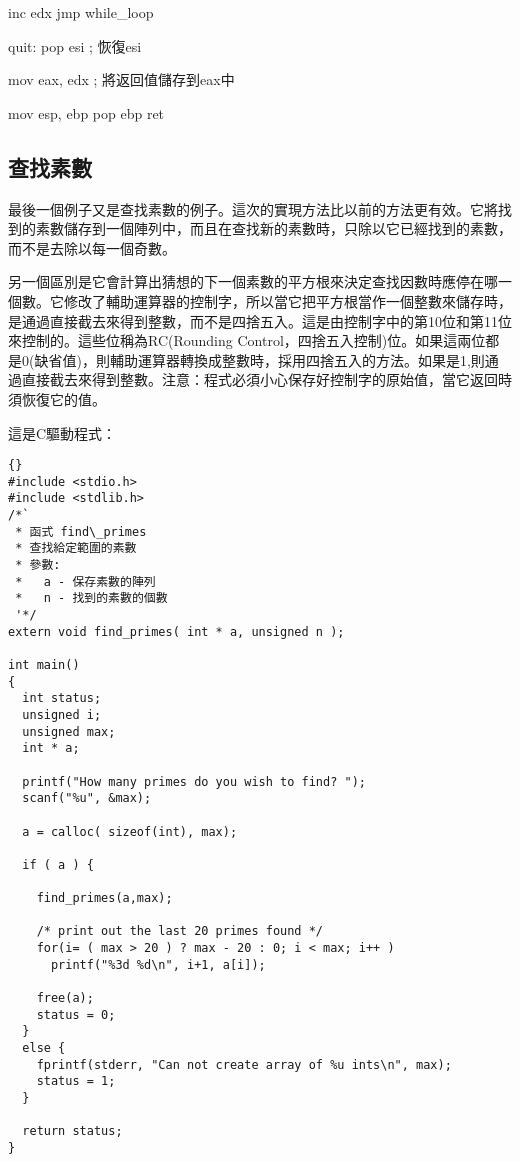{\begin{AsmCodeListing}[label=read.asm]
        inc     edx
        jmp     while_loop

quit:
        pop     esi                     ; 恢復esi

        mov     eax, edx                ; 將返回值儲存到eax中

        mov     esp, ebp
        pop     ebp
        ret
\end{AsmCodeListing}

\subsection{查找素數}

最後一個例子又是查找素數的例子。這次的實現方法比以前的方法更有效。它將找到的素數儲存到一個陣列中，而且在查找新的素數時，只除以它已經找到的素數，而不是去除以每一個奇數。

另一個區別是它會計算出猜想的下一個素數的平方根來決定查找因數時應停在哪一個數。它修改了輔助運算器的控制字，所以當它把平方根當作一個整數來儲存時，是通過直接截去來得到整數，而不是四捨五入。這是由控制字中的第10位和第11位來控制的。這些位稱為RC(Rounding Control，四捨五入控制)位。如果這兩位都是0(缺省值)，則輔助運算器轉換成整數時，採用四捨五入的方法。如果是1,則通過直接截去來得到整數。注意：程式必須小心保存好控制字的原始值，當它返回時須恢復它的值。

這是C驅動程式：
\lstset{escapeinside=`',language=Pascal,%
}
\begin{lstlisting}{}
#include <stdio.h>
#include <stdlib.h>
/*`
 * 函式 find\_primes
 * 查找給定範圍的素數
 * 參數:
 *   a - 保存素數的陣列
 *   n - 找到的素數的個數
 '*/
extern void find_primes( int * a, unsigned n );

int main()
{
  int status;
  unsigned i;
  unsigned max;
  int * a;

  printf("How many primes do you wish to find? ");
  scanf("%u", &max);

  a = calloc( sizeof(int), max);

  if ( a ) {

    find_primes(a,max);

    /* print out the last 20 primes found */
    for(i= ( max > 20 ) ? max - 20 : 0; i < max; i++ )
      printf("%3d %d\n", i+1, a[i]);

    free(a);
    status = 0;
  }
  else {
    fprintf(stderr, "Can not create array of %u ints\n", max);
    status = 1;
  }

  return status;
}
\end{lstlisting}

}
